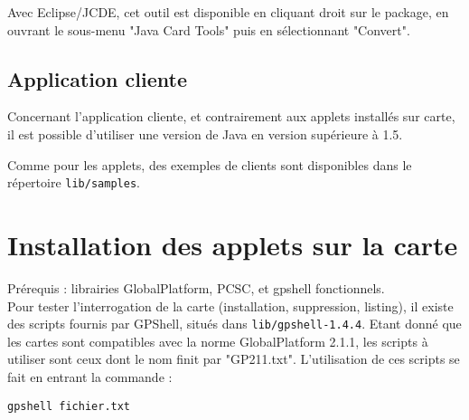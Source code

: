 \documentclass[a4paper,11pt,french]{article}
\begin{document}
Avec Eclipse/JCDE, cet outil est disponible en cliquant droit sur le package,
en ouvrant le sous-menu "Java Card Tools" puis en sélectionnant "Convert".


\subsection{Application cliente}
Concernant l'application cliente, et contrairement aux applets installés sur 
carte, il est possible d'utiliser une version de Java en version supérieure à 1.5.

Comme pour les applets, des exemples de clients sont disponibles dans le répertoire
\texttt{lib/samples}.


\section{Installation des applets sur la carte}
Prérequis : librairies GlobalPlatform, PCSC, et gpshell fonctionnels.\\

Pour tester l'interrogation de la carte (installation, suppression,
listing), il existe des scripts fournis par GPShell, situés dans \texttt{lib/gpshell-1.4.4}.
Etant donné que les cartes sont compatibles avec la norme GlobalPlatform 2.1.1,
les scripts à utiliser sont ceux dont le nom finit par "GP211.txt".
L'utilisation de ces scripts se fait en entrant la commande : 
\begin{verbatim}
gpshell fichier.txt
\end{verbatim}
\end{document}
